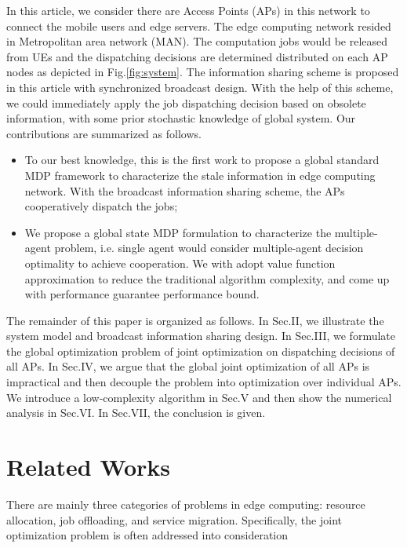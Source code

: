 In this article, we consider there are Access Points (APs) in this network to connect the mobile users and edge servers.
The edge computing network resided in Metropolitan area network (MAN).
The computation jobs would be released from UEs and the dispatching decisions are determined distributed on each AP nodes as depicted in Fig.\ref{fig:system}.
The information sharing scheme is proposed in this article with synchronized broadcast design. With the help of this scheme, we could immediately apply the job dispatching decision based on obsolete information, with some prior stochastic knowledge of global system.
Our contributions are summarized as follows.
\begin{itemize}
    \item To our best knowledge, this is the first work to propose a global standard MDP framework to characterize the stale information in edge computing network.
    With the broadcast information sharing scheme, the APs cooperatively dispatch the jobs;
    \item We propose a global state MDP formulation to characterize the multiple-agent problem, i.e. single agent would consider multiple-agent decision optimality to achieve cooperation.
    We with adopt value function approximation to reduce the traditional algorithm complexity, and come up with performance guarantee performance bound.
\end{itemize}

The remainder of this paper is organized as follows.
In Sec.II, we illustrate the system model and broadcast information sharing design.
In Sec.III, we formulate the global optimization problem of joint optimization on dispatching decisions of all APs.
In Sec.IV, we argue that the global joint optimization of all APs is impractical and then decouple the problem into optimization over individual APs.
We introduce a low-complexity algorithm in Sec.V and then show the numerical analysis in Sec.VI.
In Sec.VII, the conclusion is given.

\section{Related Works}
There are mainly three categories of problems in edge computing: resource allocation, job offloading, and service migration.
Specifically, the joint optimization problem is often addressed into consideration

